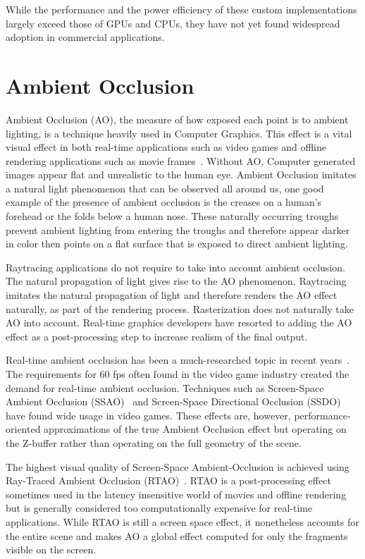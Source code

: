 While the performance and the power efficiency of these custom implementations largely exceed those of GPUs and CPUs, they have not yet found widespread adoption in commercial applications.

\section{Ambient Occlusion}
\label{sec:ao_intro}

Ambient Occlusion (AO), the measure of how exposed each point is to ambient lighting, is a technique heavily used in Computer Graphics.
This effect is a vital visual effect in both real-time applications such as video games and offline rendering applications such as movie frames~\cite{Pharr2019}. Without AO, Computer generated images appear flat and unrealistic to the human eye. Ambient Occlusion imitates a natural light phenomenon that can be observed all around us, one good example of the presence of ambient occlusion is the creases on a human's forehead or the folds below a human nose. These naturally occurring troughs prevent ambient lighting from entering the troughs and therefore appear darker in color then points on a flat surface that is exposed to direct ambient lighting. 

Raytracing applications do not require to take into account ambient occlusion. The natural propagation of light gives rise to the AO phenomenon. Raytracing imitates the natural propagation of light and therefore renders the AO effect naturally, as part of the rendering process. Rasterization does not naturally take AO into account. Real-time graphics developers have resorted to adding the AO effect as a post-processing step to increase realism of the final output. 

Real-time ambient occlusion has been a much-researched topic in recent years~\cite{10.5555/2383795.2383810, 10.1145/2448196.2448214, article_o_whatever_again, article_ao_whatever}. The requirements for 60 fps often found in the video game industry created the demand for real-time ambient occlusion. Techniques such as Screen-Space Ambient Occlusion (SSAO)~\cite{10.1145/2945292.2945300} and Screen-Space Directional Occlusion (SSDO)~\cite{article_SSDO} have found wide usage in video games. These effects are, however, performance-oriented approximations of the true Ambient Occlusion effect but operating on the Z-buffer rather than operating on the full geometry of the scene.

The highest visual quality of Screen-Space Ambient-Occlusion is achieved using Ray-Traced Ambient Occlusion (RTAO)~\cite{laine_kerras_AO}. RTAO is a post-processing effect sometimes used in the latency insensitive world of movies and offline rendering but is generally considered too computationally expensive for real-time applications. While RTAO is still a screen space effect, it nonetheless accounts for the entire scene and makes AO a global effect computed for only the fragments visible on the screen. 

